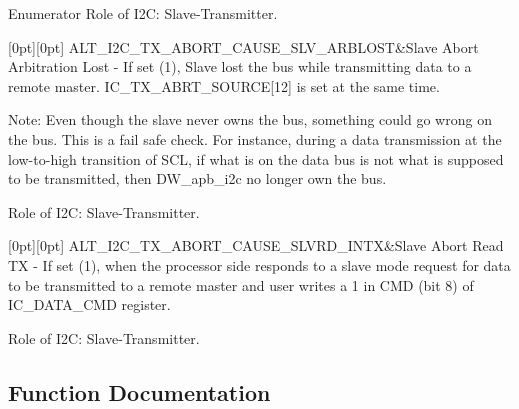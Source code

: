 \begin{DoxyEnumFields}{Enumerator}
Role of I2C\+: Slave-\/\+Transmitter. \\
\hline

[0pt][0pt]{}\mbox{\label{group__ALT__I2C_gga321dbe61df714c442640f1c4a908aabfa598fa279cf304f1ab3792ef9a17b4e01}} 
A\+L\+T\+\_\+\+I2\+C\+\_\+\+T\+X\+\_\+\+A\+B\+O\+R\+T\+\_\+\+C\+A\+U\+S\+E\+\_\+\+S\+L\+V\+\_\+\+A\+R\+B\+L\+O\+ST&Slave Abort Arbitration Lost -\/ If set (1), Slave lost the bus while transmitting data to a remote master. I\+C\+\_\+\+T\+X\+\_\+\+A\+B\+R\+T\+\_\+\+S\+O\+U\+R\+CE\mbox{[}12\mbox{]} is set at the same time.

Note\+: Even though the slave never owns the bus, something could go wrong on the bus. This is a fail safe check. For instance, during a data transmission at the low-\/to-\/high transition of S\+CL, if what is on the data bus is not what is supposed to be transmitted, then D\+W\+\_\+apb\+\_\+i2c no longer own the bus.

Role of I2C\+: Slave-\/\+Transmitter. \\
\hline

[0pt][0pt]{}\mbox{\label{group__ALT__I2C_gga321dbe61df714c442640f1c4a908aabfa2614ceb1001e929a135764323c823992}} 
A\+L\+T\+\_\+\+I2\+C\+\_\+\+T\+X\+\_\+\+A\+B\+O\+R\+T\+\_\+\+C\+A\+U\+S\+E\+\_\+\+S\+L\+V\+R\+D\+\_\+\+I\+N\+TX&Slave Abort Read TX -\/ If set (1), when the processor side responds to a slave mode request for data to be transmitted to a remote master and user writes a 1 in C\+MD (bit 8) of I\+C\+\_\+\+D\+A\+T\+A\+\_\+\+C\+MD register.

Role of I2C\+: Slave-\/\+Transmitter. \\
\hline

\end{DoxyEnumFields}


\subsection{Function Documentation}
\mbox{\label{group__ALT__I2C_gad16c19c9abacbfbe6f4501b0db490322}} 
